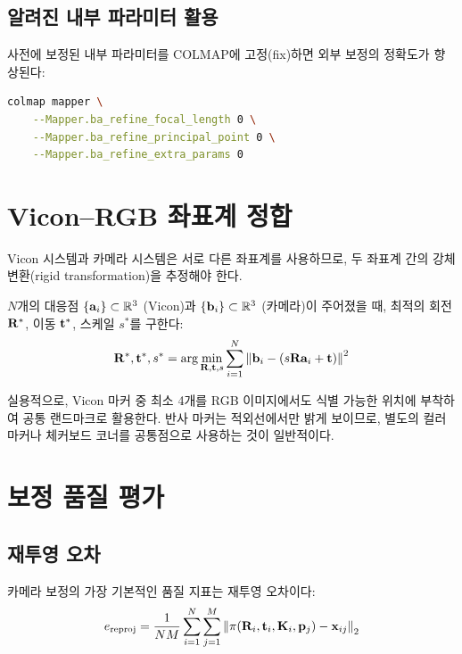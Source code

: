 \documentclass[11pt, a4paper]{report}
\begin{document}
\subsection{알려진 내부 파라미터 활용}

사전에 보정된 내부 파라미터를 COLMAP에 고정(fix)하면 외부 보정의 정확도가 향상된다:

\begin{codebox}[title={내부 파라미터 고정}]
\begin{lstlisting}[language=bash]
colmap mapper \
    --Mapper.ba_refine_focal_length 0 \
    --Mapper.ba_refine_principal_point 0 \
    --Mapper.ba_refine_extra_params 0
\end{lstlisting}
\end{codebox}

\section{Vicon--RGB 좌표계 정합}

Vicon 시스템과 카메라 시스템은 서로 다른 좌표계를 사용하므로, 두 좌표계 간의 강체 변환(rigid transformation)을 추정해야 한다.

\begin{definition}[Procrustes 정합]
$N$개의 대응점 $\{\mathbf{a}_i\} \subset \mathbb{R}^3$ (Vicon)과 $\{\mathbf{b}_i\} \subset \mathbb{R}^3$ (카메라)이 주어졌을 때,
최적의 회전 $\mathbf{R}^*$, 이동 $\mathbf{t}^*$, 스케일 $s^*$를 구한다:
\begin{equation}
  \mathbf{R}^*, \mathbf{t}^*, s^* = \arg\min_{\mathbf{R}, \mathbf{t}, s} \sum_{i=1}^{N} \left\| \mathbf{b}_i - (s\mathbf{R}\mathbf{a}_i + \mathbf{t}) \right\|^2
\end{equation}
\end{definition}

실용적으로, Vicon 마커 중 최소 4개를 RGB 이미지에서도 식별 가능한 위치에 부착하여 공통 랜드마크로 활용한다.
반사 마커는 적외선에서만 밝게 보이므로, 별도의 컬러 마커나 체커보드 코너를 공통점으로 사용하는 것이 일반적이다.

\section{보정 품질 평가}

\subsection{재투영 오차}

카메라 보정의 가장 기본적인 품질 지표는 재투영 오차이다:
\begin{equation}
  e_{\text{reproj}} = \frac{1}{NM} \sum_{i=1}^{N}\sum_{j=1}^{M} \left\| \pi(\mathbf{R}_i, \mathbf{t}_i, \mathbf{K}_i, \mathbf{p}_j) - \mathbf{x}_{ij} \right\|_2
\end{equation}
\end{document}
